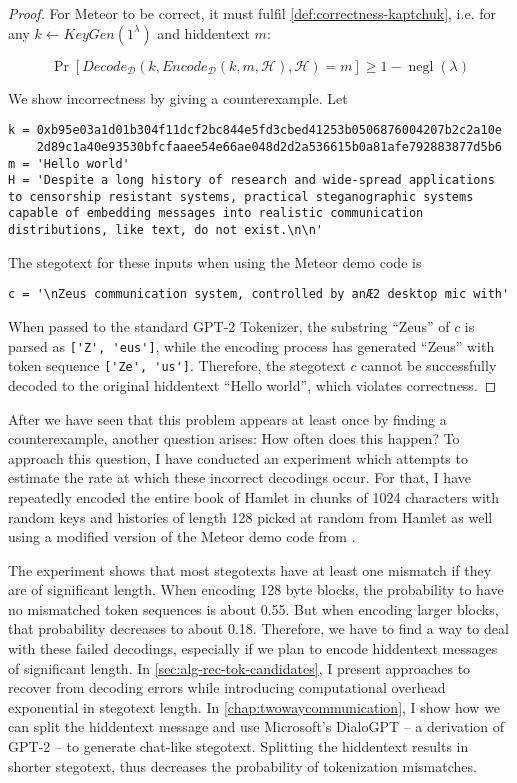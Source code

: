 \begin{proof}
For Meteor to be correct, it must fulfil \autoref{def:correctness-kaptchuk}, i.e. for any $k \leftarrow KeyGen(1^\lambda)$ and hiddentext $m$:

$$\mathop{Pr}[Decode_{\mathcal{D}}(k, Encode_{\mathcal{D}}(k, m, \mathcal{H}), \mathcal{H}) = m] \geq 1 - \mathop{negl}(\lambda)$$

We show incorrectness by giving a counterexample. 
Let

\begin{lstlisting}[breaklines]
k = 0xb95e03a1d01b304f11dcf2bc844e5fd3cbed41253b0506876004207b2c2a10e
    2d89c1a40e93530bfcfaaee54e66ae048d2d2a536615b0a81afe792883877d5b6
m = 'Hello world'
H = 'Despite a long history of research and wide-spread applications to censorship resistant systems, practical steganographic systems capable of embedding messages into realistic communication distributions, like text, do not exist.\n\n'
\end{lstlisting}

The stegotext for these inputs when using the Meteor demo code is

\begin{lstlisting}
c = '\nZeus communication system, controlled by anÆ2 desktop mic with'
\end{lstlisting}

When passed to the standard GPT-2 Tokenizer, the substring ``Zeus'' of $c$ is parsed as \lstinline{['Z', 'eus']}, while the encoding process has generated ``Zeus'' with token sequence \lstinline{['Ze', 'us']}.
Therefore, the stegotext $c$ cannot be successfully decoded to the original hiddentext ``Hello world'', which violates correctness.
\end{proof}

After we have seen that this problem appears at least once by finding a counterexample, another question arises:
How often does this happen?
To approach this question, I have conducted an experiment which attempts to estimate the rate at which these incorrect decodings occur.
For that, I have repeatedly encoded the entire book of Hamlet in chunks of 1024 characters with random keys and histories of length 128 picked at random from Hamlet as well using a modified version of the Meteor demo code from \cite{MeteorDemo2021}.

The experiment shows that most stegotexts have at least one mismatch if they are of significant length.
When encoding 128 byte blocks, the probability to have no mismatched token sequences is about 0.55.
But when encoding larger blocks, that probability decreases to about 0.18.
Therefore, we have to find a way to deal with these failed decodings, especially if we plan to encode hiddentext messages of significant length.
In \autoref{sec:alg-rec-tok-candidates}, I present approaches to recover from decoding errors while introducing computational overhead exponential in stegotext length. 
In \autoref{chap:twowaycommunication}, I show how we can split the hiddentext message and use Microsoft's DialoGPT -- a derivation of GPT-2 -- to generate chat-like stegotext.
Splitting the hiddentext results in shorter stegotext, thus decreases the probability of tokenization mismatches.

